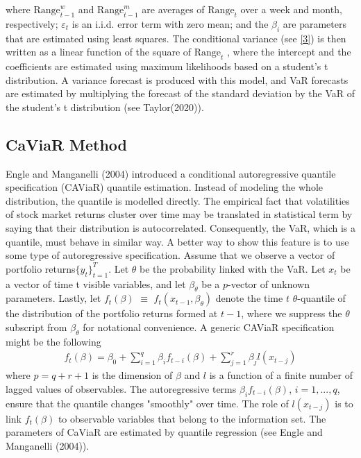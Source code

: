 \documentclass[a4paper,11pt,oneside]{book}
\begin{document}
where  $\text{Range}^{w}_{t-1}$
and $\text{Range}^{m}_{t-1}$ are
averages of $\text{Range}_{t}$ over a week and month, respectively;
$\varepsilon_t$
is an i.i.d. error term with zero mean; and the $\beta_{i}$
are parameters that are estimated using least squares.
The conditional variance (see \autoref{3})  is then written as a linear
function of the square of $\text{Range}_{t}$
, where the intercept and
the coefficients are estimated using maximum likelihoods
based on a student's t distribution. A variance forecast is produced with this model, and VaR forecasts are estimated by multiplying the forecast of the standard deviation by the VaR of the student's t distribution (see Taylor(2020)).


\subsection{CaViaR Method}
Engle and Manganelli (2004) introduced a conditional autoregressive quantile specification (CAViaR) quantile estimation. Instead of modeling the whole distribution, the quantile is modelled directly. The empirical fact that volatilities of stock market returns cluster over time may be translated in statistical term by saying that their distribution is autocorrelated. Consequently, the VaR, which is a quantile, must behave in similar way. A better way to show this feature is to use some type of autoregressive specification.
\newline\newline
 Assume that we observe a vector of portfolio returns$\{y_t\}^T_{t=1}$. Let $\theta$ be the probability linked with the VaR. Let $x_t$ be a vector of time t visible variables, and let  ${\beta}_\theta$ be a $p$-vector of unknown parameters. Lastly, let $f_t(\beta) $ $\equiv$ $ f_t(x_{t-1},{\beta}_\theta)$ denote the time $t$ $\theta$-quantile of the distribution of the portfolio returns formed at $t-1$, where we suppress the $\theta$ subscript from $\beta_\theta$ for notational convenience. A generic CAViaR specification might be the following  
\begin{equation}
\begin{aligned}
f_t(\beta)=\beta_0 + \sum_{i=1}^{q} \beta_{i}f _{t-i}(\beta) +\sum_{j=1}^{r}\beta_{j}l(x_{t-j})
\label{5}
\end{aligned}
\end{equation}
where $p=q+r+1$ is the dimension of $\beta$ and $l$ is a function of a finite number of lagged values of observables. The autoregressive terms $\beta_{i}f_{t-i}(\beta)$, $i = 1,...,q$, ensure that the quantile changes "smoothly" over time. The role of $l(x_{t-j})$ is to link $f_{t}(\beta)$ to observable variables that belong to the information set. The parameters of CaViaR are estimated by quantile regression (see Engle and Manganelli (2004)).
\end{document}

